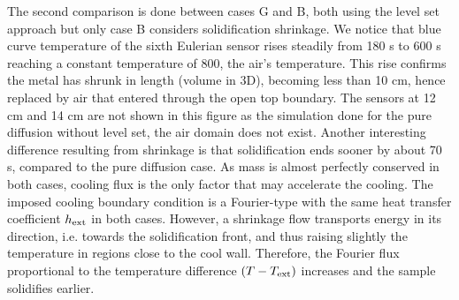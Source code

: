 The second comparison is done between cases G and B, both using the level set approach but only case B considers solidification shrinkage.
We notice that blue curve temperature of the sixth 
Eulerian sensor rises steadily from 180 s to 600 s reaching a constant temperature of \SI{800}{\udegC}, the air's temperature. 
This rise confirms the metal has shrunk in length (volume in 3D),
becoming less than 10 cm, hence replaced by air that entered through the open top boundary.
The sensors at 12 cm and 14 cm are not shown in this figure as the simulation done for the pure diffusion without level set, the air domain does not exist.
Another interesting difference resulting from shrinkage is that solidification ends sooner by about 70 s, compared to the pure diffusion case.
As mass is almost perfectly conserved in both cases, cooling flux is the only factor that may accelerate the cooling. The imposed cooling boundary condition
is a Fourier-type with the same heat transfer coefficient $h_{\text{ext}}$ in both cases. However, a shrinkage flow transports energy in its direction, i.e. towards the solidification
front, and thus raising slightly the temperature in regions close to the cool wall. Therefore, the Fourier flux proportional to the temperature difference $(T-T_{\text{ext}})$ increases
and the sample solidifies earlier. 

